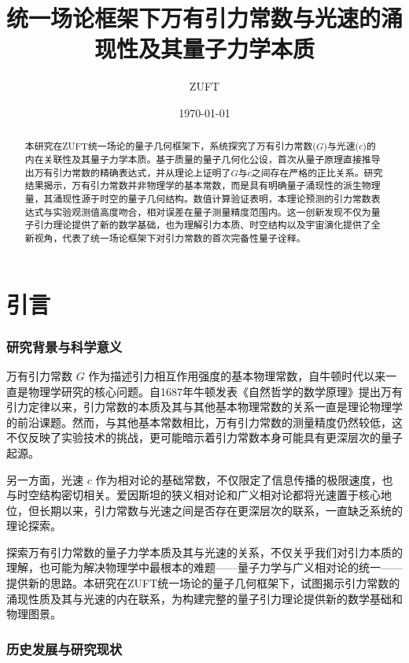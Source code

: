 \documentclass[12pt,twocolumn]{article}
\title{统一场论框架下万有引力常数与光速的涌现性及其量子力学本质}
\author{ZUFT}
\date{\today}
\begin{document}
\maketitle

\begin{abstract}
\noindent 本研究在ZUFT统一场论的量子几何框架下，系统探究了万有引力常数($G$)与光速($c$)的内在关联性及其量子力学本质。基于质量的量子几何化公设，首次从量子原理直接推导出万有引力常数的精确表达式，并从理论上证明了$G$与$c$之间存在严格的正比关系。研究结果揭示，万有引力常数并非物理学的基本常数，而是具有明确量子涌现性的派生物理量，其涌现性源于时空的量子几何结构。数值计算验证表明，本理论预测的引力常数表达式与实验观测值高度吻合，相对误差在量子测量精度范围内。这一创新发现不仅为量子引力理论提供了新的数学基础，也为理解引力本质、时空结构以及宇宙演化提供了全新视角，代表了统一场论框架下对引力常数的首次完备性量子诠释。
\end{abstract}

\section{引言}

\subsubsection{研究背景与科学意义}

万有引力常数 $G$ 作为描述引力相互作用强度的基本物理常数，自牛顿时代以来一直是物理学研究的核心问题。自1687年牛顿发表《自然哲学的数学原理》提出万有引力定律以来，引力常数的本质及其与其他基本物理常数的关系一直是理论物理学的前沿课题。然而，与其他基本常数相比，万有引力常数的测量精度仍然较低，这不仅反映了实验技术的挑战，更可能暗示着引力常数本身可能具有更深层次的量子起源。

另一方面，光速 $c$ 作为相对论的基础常数，不仅限定了信息传播的极限速度，也与时空结构密切相关。爱因斯坦的狭义相对论和广义相对论都将光速置于核心地位，但长期以来，引力常数与光速之间是否存在更深层次的联系，一直缺乏系统的理论探索。

探索万有引力常数的量子力学本质及其与光速的关系，不仅关乎我们对引力本质的理解，也可能为解决物理学中最根本的难题——量子力学与广义相对论的统一——提供新的思路。本研究在ZUFT统一场论的量子几何框架下，试图揭示引力常数的涌现性质及其与光速的内在联系，为构建完整的量子引力理论提供新的数学基础和物理图景。

\subsubsection{历史发展与研究现状}
\end{document}
